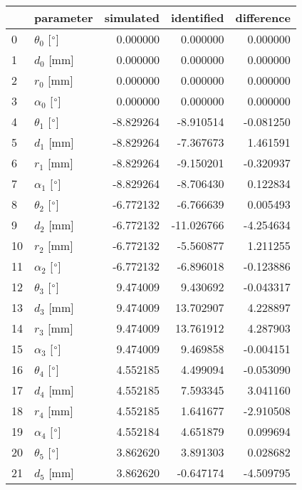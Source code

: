 \documentclass{standalone}%
\begin{document}
%
\normalsize%
\begin{tabular}{llrrr}
\toprule
{} &                 parameter & simulated & identified & difference \\
\midrule
0  &  $\theta_{0}$ [$\degree$] &  0.000000 &   0.000000 &   0.000000 \\
1  &              $d_{0}$ [mm] &  0.000000 &   0.000000 &   0.000000 \\
2  &              $r_{0}$ [mm] &  0.000000 &   0.000000 &   0.000000 \\
3  &  $\alpha_{0}$ [$\degree$] &  0.000000 &   0.000000 &   0.000000 \\
4  &  $\theta_{1}$ [$\degree$] & -8.829264 &  -8.910514 &  -0.081250 \\
5  &              $d_{1}$ [mm] & -8.829264 &  -7.367673 &   1.461591 \\
6  &              $r_{1}$ [mm] & -8.829264 &  -9.150201 &  -0.320937 \\
7  &  $\alpha_{1}$ [$\degree$] & -8.829264 &  -8.706430 &   0.122834 \\
8  &  $\theta_{2}$ [$\degree$] & -6.772132 &  -6.766639 &   0.005493 \\
9  &              $d_{2}$ [mm] & -6.772132 & -11.026766 &  -4.254634 \\
10 &              $r_{2}$ [mm] & -6.772132 &  -5.560877 &   1.211255 \\
11 &  $\alpha_{2}$ [$\degree$] & -6.772132 &  -6.896018 &  -0.123886 \\
12 &  $\theta_{3}$ [$\degree$] &  9.474009 &   9.430692 &  -0.043317 \\
13 &              $d_{3}$ [mm] &  9.474009 &  13.702907 &   4.228897 \\
14 &              $r_{3}$ [mm] &  9.474009 &  13.761912 &   4.287903 \\
15 &  $\alpha_{3}$ [$\degree$] &  9.474009 &   9.469858 &  -0.004151 \\
16 &  $\theta_{4}$ [$\degree$] &  4.552185 &   4.499094 &  -0.053090 \\
17 &              $d_{4}$ [mm] &  4.552185 &   7.593345 &   3.041160 \\
18 &              $r_{4}$ [mm] &  4.552185 &   1.641677 &  -2.910508 \\
19 &  $\alpha_{4}$ [$\degree$] &  4.552184 &   4.651879 &   0.099694 \\
20 &  $\theta_{5}$ [$\degree$] &  3.862620 &   3.891303 &   0.028682 \\
21 &              $d_{5}$ [mm] &  3.862620 &  -0.647174 &  -4.509795 \\

\end{tabular}
\end{document}

